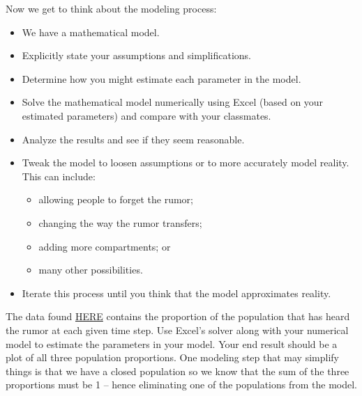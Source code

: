         \begin{problem}
        Now we get to think about the modeling process:
            \begin{itemize}
                \item We have a mathematical model.
                \item Explicitly state your assumptions and simplifications.
                \item Determine how you might estimate each parameter in the model.
                \item Solve the mathematical model numerically using Excel (based on your
                    estimated parameters) and compare with your classmates.
                \item Analyze the results and see if they seem reasonable.
                \item Tweak the model to loosen assumptions or to more accurately model
                    reality.  This can include:
                    \begin{itemize}
                        \item allowing people to forget the rumor;
                        \item changing the way the rumor transfers;
                        \item adding more compartments; or
                        \item many other possibilities.
                    \end{itemize}
                \item Iterate this process until you think that the model approximates
                    reality.
            \end{itemize}
        \end{problem}

        \begin{problem}
            The data found
            \href{https://docs.google.com/spreadsheets/d/1jS6w4gFmxFmgaSzDaD90vDOpN2N3-DdadTxkd9pvaMI/edit?usp=sharing}{HERE} contains the proportion of the population  that has heard
            the rumor at each given time step.  Use Excel's solver along with your
            numerical model to estimate the parameters in your model.  Your end result
            should be a plot of all three population proportions.  One modeling step that
            may simplify things is that we have a closed population so we know that the
            sum of the three proportions must be 1 -- hence eliminating one of the
            populations from the model.
        \end{problem}

